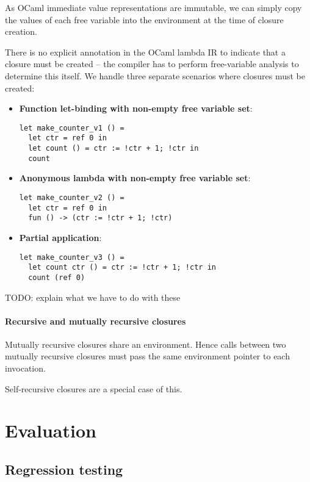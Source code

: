 \documentclass[12pt,a4paper,twoside,openright]{report}
\begin{document}
As OCaml immediate value representations are immutable, we can simply copy the
values of each free variable into the environment at the time of closure
creation.

There is no explicit annotation in the OCaml lambda IR to indicate that a
closure must be created -- the compiler has to perform free-variable analysis
to determine this itself. We handle three separate scenarios where closures
must be created:

\begin{itemize}
    \item \textbf{Function let-binding with non-empty free variable set}:
      \begin{lstlisting}
let make_counter_v1 () =
  let ctr = ref 0 in
  let count () = ctr := !ctr + 1; !ctr in
  count
      \end{lstlisting}
    \item \textbf{Anonymous lambda with non-empty free variable set}:
      \begin{lstlisting}
let make_counter_v2 () =
  let ctr = ref 0 in
  fun () -> (ctr := !ctr + 1; !ctr)
      \end{lstlisting}
    \item \textbf{Partial application}:
      \begin{lstlisting}
let make_counter_v3 () =
  let count ctr () = ctr := !ctr + 1; !ctr in
  count (ref 0)
      \end{lstlisting}
\end{itemize}

TODO: explain what we have to do with these

\subsubsection{Recursive and mutually recursive closures}

Mutually recursive closures share an environment. Hence calls between two
mutually recursive closures must pass the same environment pointer to each
invocation.

Self-recursive closures are a special case of this.



\chapter{Evaluation}

\section{Regression testing}
\end{document}
